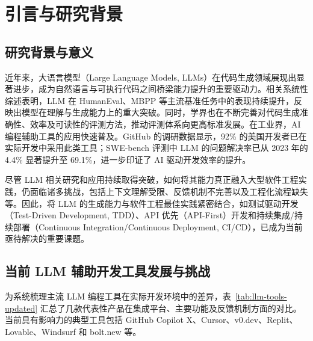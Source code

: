 
\chapter{引言与研究背景}

\section{研究背景与意义}
近年来，大语言模型（Large Language Models, LLMs）在代码生成领域展现出显著进步，成为自然语言与可执行代码之间桥梁能力提升的重要驱动力。相关系统性综述表明，LLM 在 HumanEval、MBPP 等主流基准任务中的表现持续提升，反映出模型在理解与生成能力上的重大突破\cite{jiang2024survey}。同时，学界也在不断完善对代码生成准确性、效率及可读性的评测方法，推动评测体系向更高标准发展\cite{chen2024eval}。在工业界，AI 编程辅助工具的应用快速普及。GitHub 的调研数据显示，92\% 的美国开发者已在实际开发中采用此类工具\cite{githubblog2023}；SWE-bench 评测中 LLM 的问题解决率已从 2023 年的 4.4\% 显著提升至 69.1\%，进一步印证了 AI 驱动开发效率的提升\cite{ft2025ai}。

尽管 LLM 相关研究和应用持续取得突破，如何将其能力真正融入大型软件工程实践，仍面临诸多挑战，包括上下文理解受限、反馈机制不完善以及工程化流程缺失等。因此，将 LLM 的生成能力与软件工程最佳实践紧密结合，如测试驱动开发（Test-Driven Development, TDD）、API 优先（API-First）开发和持续集成/持续部署（Continuous Integration/Continuous Deployment, CI/CD），已成为当前亟待解决的重要课题。

\section{当前 LLM 辅助开发工具发展与挑战}

为系统梳理主流 LLM 编程工具在实际开发环境中的差异，表~\ref{tab:llm-tools-updated} 汇总了几款代表性产品在集成平台、主要功能及反馈机制方面的对比。当前具有影响力的典型工具包括 GitHub Copilot X、Cursor、v0.dev、Replit、Lovable、Windsurf 和 bolt.new 等。


